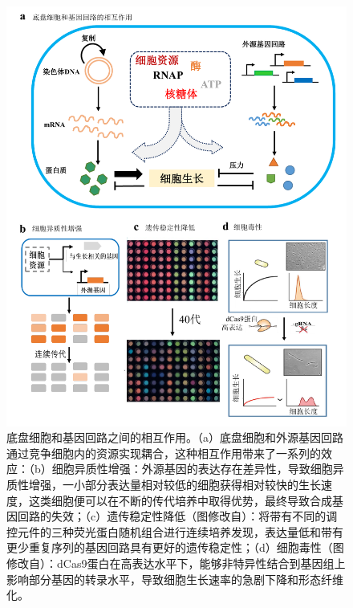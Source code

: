 \documentclass[b5paper,9pt,oneolumn,twoside,UTF8]{article}
\begin{document}
\begin{figure}[H]
  \centering
  \includegraphics[width=1.0\textwidth]{reviewer_figure1}
  \caption{底盘细胞和基因回路之间的相互作用。{\scriptsize （a）底盘细胞和外源基因回路通过竞争细胞内的资源实现耦合，这种相互作用带来了一系列的效应：（b）细胞异质性增强：外源基因的表达存在差异性，导致细胞异质性增强，一小部分表达量相对较低的细胞获得相对较快的生长速度，这类细胞便可以在不断的传代培养中取得优势，最终导致合成基因回路的失效；（c）遗传稳定性降低（图修改自\cite{Sleight2013}）：将带有不同的调控元件的三种荧光蛋白随机组合进行连续培养发现，表达量低和带有更少重复序列的基因回路具有更好的遗传稳定性；（d）细胞毒性（图修改自\cite{Hasnain2019}）：dCas9蛋白在高表达水平下，能够非特异性结合到基因组上影响部分基因的转录水平，导致细胞生长速率的急剧下降和形态纤维化。}}
  \label{fig.1}
\end{figure}
\end{document}
